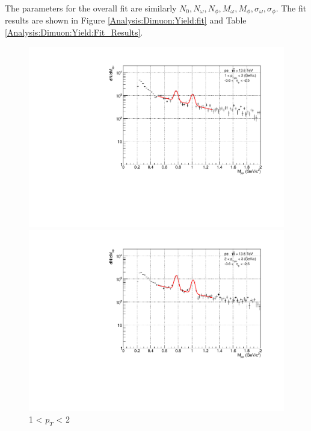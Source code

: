                 The parameters for the overall fit are similarly \(N_0, N_{\omega}, N_{\phi}, M_{\omega}, M_{\phi}, \sigma_{\omega}, \sigma_{\phi}\). The fit results are shown in Figure \ref{Analysis:Dimuon:Yield:fit} and Table \ref{Analysis:Dimuon:Yield:Fit_Results}.
                \begin{figure}[H]
                    \centering
                    \begin{minipage}{0.45\textwidth}
                        \centering
                        \includegraphics[width=\textwidth]{fig/3_4_2_fit_pt_1to2.pdf}
                        \captionsetup{labelformat=empty}
                        \caption*{1 < $p_{T}$ < 2}
                    \end{minipage}
                    \hfill
                    \begin{minipage}{0.45\textwidth}
                        \centering
                        \includegraphics[width=\textwidth]{fig/3_4_2_fit_pt_2to3.pdf}

\end{minipage}
\end{figure}
